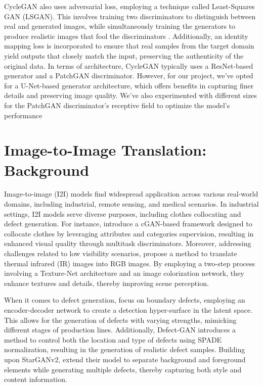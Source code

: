 \documentclass[UKenglish,12pt]{master-style}
\begin{document}
CycleGAN also uses adversarial loss, employing a technique called Least-Squares GAN (LSGAN). This involves training two discriminators to distinguish between real and generated images, while simultaneously training the generators to produce realistic images that fool the discriminators \cite{unpaired_horse2zebra_cyclgan} . Additionally, an identity mapping loss is incorporated to ensure that real samples from the target domain yield outputs that closely match the input, preserving the authenticity of the original data.
In terms of architecture, CycleGAN typically uses a ResNet-based generator and a PatchGAN discriminator. However, for our project, we've opted for a U-Net-based generator architecture, which offers benefits in capturing finer details and preserving image quality. We've also experimented with different sizes for the PatchGAN discriminator's receptive field to optimize the model's performance

\section{Image-to-Image Translation: Background}

Image-to-image (I2I) models find widespread application across various real-world domains, including industrial, remote sensing, and medical scenarios.  In industrial settings, I2I models serve diverse purposes, including clothes collocating and defect generation. For instance, \cite{application}  introduce a cGAN-based framework designed to collocate clothes by leveraging attributes and categories supervision, resulting in enhanced visual quality through multitask discriminators. Moreover, addressing challenges related to low visibility scenarios, \cite{application}propose a method to translate thermal infrared (IR) images into RGB images. By employing a two-step process involving a Texture-Net architecture and an image colorization network, they enhance textures and details, thereby improving scene perception.

When it comes to defect generation, \cite{application} focus on boundary defects, employing an encoder-decoder network to create a detection hyper-surface in the latent space. This allows for the generation of defects with varying strengths, mimicking different stages of production lines. Additionally, Defect-GAN introduces a method to control both the location and type of defects using SPADE normalization, resulting in the generation of realistic defect samples. Building upon StarGANv2, extend their model to separate background and foreground elements while generating multiple defects, thereby capturing both style and content information.
\end{document}
